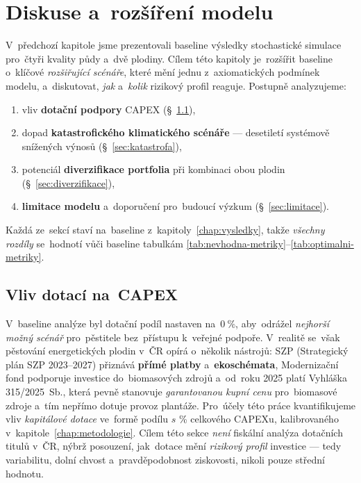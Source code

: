 \chapter{Diskuse a~rozšíření modelu}
\label{chap:diskuse}

V~předchozí kapitole jsme prezentovali baseline výsledky stochastické
simulace pro~čtyři kvality půdy a~dvě plodiny. Cílem této kapitoly
je~rozšířit baseline o~klíčové \emph{rozšiřující scénáře}, které mění
jednu z~axiomatických podmínek modelu, a~diskutovat, \emph{jak} a~\emph{kolik}
rizikový profil reaguje. Postupně analyzujeme:
\begin{enumerate}
    \item vliv \textbf{dotační podpory} CAPEX (\S~\ref{sec:dotace}),
    \item dopad \textbf{katastrofického klimatického scénáře} ---
          desetiletí systémově snížených výnosů (\S~\ref{sec:katastrofa}),
    \item potenciál \textbf{diverzifikace portfolia} při kombinaci obou
          plodin (\S~\ref{sec:diverzifikace}),
    \item \textbf{limitace modelu} a~doporučení pro~budoucí výzkum
          (\S~\ref{sec:limitace}).
\end{enumerate}

Každá ze~sekcí staví na~baseline z~kapitoly~\ref{chap:vysledky}, takže
\emph{všechny rozdíly} se~hodnotí vůči baseline tabulkám
\ref{tab:nevhodna-metriky}--\ref{tab:optimalni-metriky}.

\section{Vliv dotací na~CAPEX}
\label{sec:dotace}

V~baseline analýze byl dotační podíl nastaven na~$0~\%$, aby~odrážel
\emph{nejhorší možný scénář} pro~pěstitele bez~přístupu k~veřejné
podpoře. V~realitě se~však pěstování energetických plodin v~ČR opírá
o~několik nástrojů: SZP (Strategický plán SZP 2023--2027) přiznává
\textbf{přímé platby} a~\textbf{ekoschémata}, Modernizační fond podporuje
investice do~biomasových zdrojů a~od~roku 2025 platí Vyhláška
315/2025~Sb., která pevně stanovuje \emph{garantovanou
kupní cenu} pro~biomasové zdroje a~tím nepřímo dotuje provoz
plantáže. Pro~účely této práce kvantifikujeme vliv \emph{kapitálové dotace}
ve~formě podílu \(s\) \% celkového CAPEXu, kalibrovaného v~kapitole~\ref{chap:metodologie}.
Cílem této sekce \emph{není} fiskální analýza dotačních titulů
v~ČR, nýbrž posouzení, jak~dotace mění \emph{rizikový profil}
investice — tedy variabilitu, dolní chvost a~pravděpodobnost
ziskovosti, nikoli pouze střední hodnotu.


